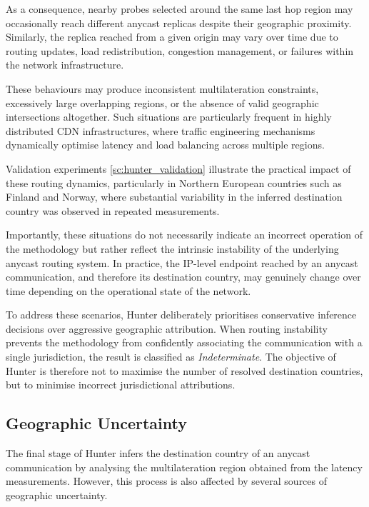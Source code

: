 As a consequence, nearby probes selected around the same last hop region may occasionally reach different anycast replicas despite their geographic proximity. Similarly, the replica reached from a given origin may vary over time due to routing updates, load redistribution, congestion management, or failures within the network infrastructure.

These behaviours may produce inconsistent multilateration constraints, excessively large overlapping regions, or the absence of valid geographic intersections altogether. Such situations are particularly frequent in highly distributed CDN infrastructures, where traffic engineering mechanisms dynamically optimise latency and load balancing across multiple regions.

Validation experiments \ref{sc:hunter_validation} illustrate the practical impact of these routing dynamics, particularly in Northern European countries such as Finland and Norway, where substantial variability in the inferred destination country was observed in repeated measurements.

Importantly, these situations do not necessarily indicate an incorrect operation of the methodology but rather reflect the intrinsic instability of the underlying anycast routing system. In practice, the IP-level endpoint reached by an anycast communication, and therefore its destination country, may genuinely change over time depending on the operational state of the network.

To address these scenarios, Hunter deliberately prioritises conservative inference decisions over aggressive geographic attribution. When routing instability prevents the methodology from confidently associating the communication with a single jurisdiction, the result is classified as \textit{Indeterminate}. The objective of Hunter is therefore not to maximise the number of resolved destination countries, but to minimise incorrect jurisdictional attributions.

\subsection{Geographic Uncertainty}
\label{sc:hunter_limitations_geographic_uncertainty}

The final stage of Hunter infers the destination country of an anycast communication by analysing the multilateration region obtained from the latency measurements. However, this process is also affected by several sources of geographic uncertainty.

